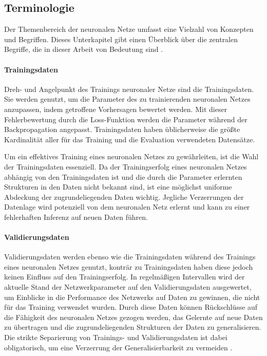 
\subsection{Terminologie}
\label{sec:nn_terminologie}

Der Themenbereich der neuronalen Netze umfasst eine Vielzahl von Konzepten und Begriffen. Dieses Unterkapitel gibt einen Überblick über die zentralen Begriffe, die in dieser Arbeit von Bedeutung sind \cite{nn_terminology}.

\paragraph{Trainingsdaten}

Dreh- und Angelpunkt des Trainings neuronaler Netze sind die Trainingsdaten. Sie werden genutzt, um die Parameter des zu trainierenden neuronalen Netzes anzupassen, indem getroffene Vorhersagen bewertet werden. Mit dieser Fehlerbewertung durch die Loss-Funktion werden die Parameter während der Backpropagation angepasst. Trainingsdaten haben üblicherweise die größte Kardinalität aller für das Training und die Evaluation verwendeten Datensätze.

Um ein effektives Training eines neuronalen Netzes zu gewährleiten, ist die Wahl der Trainingsdaten essenziell. Da der Trainingserfolg eines neuronalen Netzes abhängig von den Trainingsdaten ist und die durch die Parameter erlernten Strukturen in den Daten nicht bekannt sind, ist eine möglichst uniforme Abdeckung der zugrundeliegenden Daten wichtig. Jegliche Verzerrungen der Datenlage wird potenziell von dem neuronalen Netz erlernt und kann zu einer fehlerhaften Inferenz auf neuen Daten führen.

\paragraph{Validierungsdaten}

Validierungsdaten werden ebenso wie die Trainingsdaten während des Trainings eines neuronalen Netzes genutzt, konträr zu Trainingsdaten haben diese jedoch keinen Einfluss auf den Trainingserfolg. In regelmäßigen Intervallen wird der aktuelle Stand der Netzwerkparameter auf den Validierungsdaten ausgewertet, um Einblicke in die Performance des Netzwerks auf Daten zu gewinnen, die nicht für das Training verwendet wurden. Durch diese Daten können Rückschlüsse auf die Fähigkeit des neuronalen Netzes gezogen werden, das Gelernte auf neue Daten zu übertragen und die zugrundeliegenden Strukturen der Daten zu generalisieren. Die strikte Separierung von Trainings- und Validierungsdaten ist dabei obligatorisch, um eine Verzerrung der Generalisierbarkeit zu vermeiden \cite{nn_terminology}.

